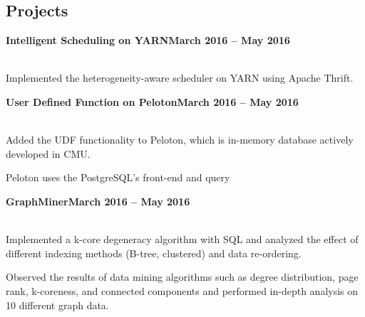 \documentclass[10pt,margin,line]{resume}
\begin{document}
\begin{resume}
\section{\mysidestyle Projects}
\textbf{Intelligent Scheduling on YARN}\hfill \textbf{March 2016 -- May 2016} \vspace{0mm}\\\vspace{0mm}%
\vspace{-7mm}\\\vspace{-1mm}%
\begin{list3}
    \item Implemented the heterogeneity-aware scheduler on YARN using Apache Thrift.
\end{list3}

\textbf{User Defined Function on Peloton}\hfill \textbf{March 2016 -- May 2016} \vspace{0mm}\\\vspace{0mm}%
\vspace{-7mm}\\\vspace{-1mm}%
\begin{list3}
    \item Added the UDF functionality to Peloton, which is in-memory database actively developed in CMU.
    \item Peloton uses the PostgreSQL's front-end and query
\end{list3}

\textbf{GraphMiner}\hfill \textbf{March 2016 -- May 2016} \vspace{0mm}\\\vspace{0mm}%
\vspace{-7mm}\\\vspace{-1mm}%
\begin{list3}
    \item Implemented a k-core degeneracy algorithm with SQL and analyzed the effect of different indexing methods (B-tree, clustered) and data re-ordering.
    \item Observed the results of data mining algorithms such as degree distribution, page rank, k-coreness, and connected components and performed in-depth analysis on 10 different graph data.
\end{list3}


\end{resume}
\end{document}
